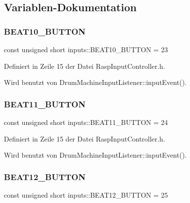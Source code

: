 \subsection{Variablen-\/\+Dokumentation}
\mbox{\label{namespaceinputs_a9778bcf3a44a9d16ae156bac6d745a24}} 
\subsubsection{\texorpdfstring{B\+E\+A\+T10\+\_\+\+B\+U\+T\+T\+ON}{BEAT10\_BUTTON}}
{\footnotesize\ttfamily const unsigned short inputs\+::\+B\+E\+A\+T10\+\_\+\+B\+U\+T\+T\+ON = 23}



Definiert in Zeile 15 der Datei Rasp\+Input\+Controller.\+h.



Wird benutzt von Drum\+Machine\+Input\+Listener\+::input\+Event().

\mbox{\label{namespaceinputs_ad09e4010a8b08721988599b198645372}} 
\subsubsection{\texorpdfstring{B\+E\+A\+T11\+\_\+\+B\+U\+T\+T\+ON}{BEAT11\_BUTTON}}
{\footnotesize\ttfamily const unsigned short inputs\+::\+B\+E\+A\+T11\+\_\+\+B\+U\+T\+T\+ON = 24}



Definiert in Zeile 15 der Datei Rasp\+Input\+Controller.\+h.



Wird benutzt von Drum\+Machine\+Input\+Listener\+::input\+Event().

\mbox{\label{namespaceinputs_a7b6bb44b9241cac31ff9909c3fc88271}} 
\subsubsection{\texorpdfstring{B\+E\+A\+T12\+\_\+\+B\+U\+T\+T\+ON}{BEAT12\_BUTTON}}
{\footnotesize\ttfamily const unsigned short inputs\+::\+B\+E\+A\+T12\+\_\+\+B\+U\+T\+T\+ON = 25}



